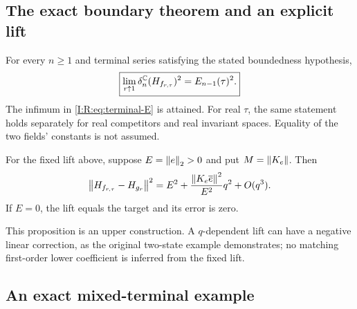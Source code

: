 \subsection{The exact boundary theorem and an explicit lift}

\begin{theorem}
\label{I:R:thm:terminal-boundary}
For every $n\ge1$ and terminal series satisfying the stated boundedness
hypothesis,
\begin{equation}
 \boxed{\displaystyle
 \lim_{r\uparrow1}\delta_n^{\mathbb C}(H_{f_{r,\tau}})^2
       =E_{n-1}(\tau)^2.}
 \label{I:R:eq:terminal-boundary-theorem}
\end{equation}
The infimum in \eqref{I:R:eq:terminal-E} is attained.  For real $\tau$, the
same statement holds separately for real competitors and real
invariant spaces.  Equality of the two fields' constants is not
assumed.
\end{theorem}


\begin{proposition}
\label{I:R:prop:terminal-fixed-lift}
For the fixed lift above, suppose $E=\left\lVert e\right\rVert_2>0$ and put
$M=\left\lVert K_e\right\rVert$.  Then
\begin{equation}
 \left\lVert H_{f_{r,\tau}}-H_{g_r}\right\rVert^2
 =E^2+\frac{\left\lVert K_e\overline e\right\rVert^2}{E^2}q^2+O(q^3).
 \label{I:R:eq:terminal-fixed-lift-expansion}
\end{equation}
If $E=0$, the lift equals the target and its error is zero.
\end{proposition}


This proposition is an upper construction.  A $q$-dependent lift can
have a negative linear correction, as the original two-state example
demonstrates; no matching first-order lower coefficient is inferred
from the fixed lift.

\subsection{An exact mixed-terminal example}

